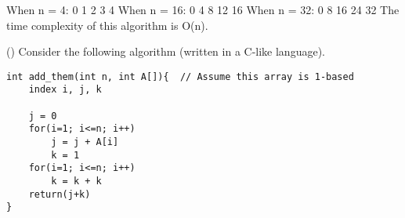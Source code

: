 \documentclass[11pt]{article}
\begin{document}
\begin{questions}
\begin{solutionorbox}
When n = 4:  0  1  2  3  4 \newline
When n = 16:  0  4  8  12  16 \newline
When n = 32:  0  8  16  24  32 \newline
\newline
The time complexity of this algorithm is O(n).

\end{solutionorbox}

\ifprintanswers
\newpage
\else
\bigskip
\fi


\question (\totalpoints {})
Consider the following algorithm (written in a C-like language).
\begin{verbatim}
int add_them(int n, int A[]){  // Assume this array is 1-based
    index i, j, k
    
    j = 0
    for(i=1; i<=n; i++)
        j = j + A[i]
    	k = 1
    for(i=1; i<=n; i++)
        k = k + k
    return(j+k)
}
\end{verbatim}
\end{questions}
\end{document}
